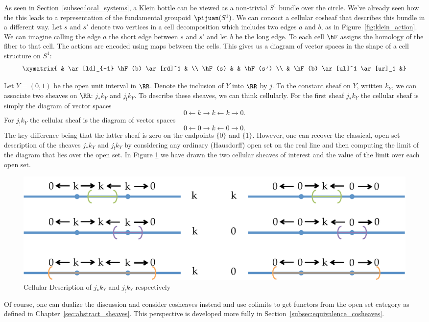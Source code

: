 \begin{ex}
 As seen in Section~\ref{subsec:local_systems}, a Klein bottle can be viewed as a non-trivial $S^1$ bundle over the circle. We've already seen how the this leads to a representation of the fundamental groupoid $\pijuan(S^1)$. We can concoct a cellular cosheaf that describes this bundle in a different way. Let $s$ and $s'$ denote two vertices in a cell decomposition which includes two edges $a$ and $b$, as in Figure~\ref{fig:klein_action}. We can imagine calling the edge $a$ the short edge between $s$ and $s'$ and let $b$ be the long edge. To each cell $\hF$ assigns the homology of the fiber to that cell. The actions are encoded using maps between the cells. This gives us a diagram of vector spaces in the shape of a cell structure on $S^1$:
 \[
  \xymatrix{ & \ar[ld]_{-1} \hF(b) \ar[rd]^1 & \\
  \hF(s) & & \hF(s') \\
  & \hF(b) \ar[ul]^1 \ar[ur]_1 &}
 \]
\end{ex}

\begin{ex}
Let $Y=(0,1)$ be the open unit interval in $\RR$. Denote the inclusion of $Y$ into $\RR$ by $j$. To the constant sheaf on $Y$, written $k_Y$, we can associate two sheaves on $\RR$: $j_*k_Y$ and $j_! k_Y$. To describe these sheaves, we can think cellularly. For the first sheaf $j_*k_Y$ the cellular sheaf is simply the diagram of vector spaces
\[
0 \leftarrow k \rightarrow k \leftarrow k \rightarrow 0.
\]
For $j_!k_Y$ the cellular sheaf is the diagram of vector spaces
\[
0 \leftarrow 0 \rightarrow k \leftarrow 0 \rightarrow 0.
\]
The key difference being that the latter sheaf is zero on the endpoints $\{0\}$ and $\{1\}$. However, one can recover the classical, open set description of the sheaves $j_*k_Y$ and $j_! k_Y$ by considering any ordinary (Hausdorff) open set on the real line and then computing the limit of the diagram that lies over the open set. In Figure \ref{fig:star_shriek} we have drawn the two cellular sheaves of interest and the value of the limit over each open set.
	\begin{figure}
	\centering
	\includegraphics[width=\textwidth]{star_shriek.pdf}
	\caption{Cellular Description of $j_*k_Y$ and $j_!k_Y$ respectively}
	\label{fig:star_shriek}
	\end{figure}
Of course, one can dualize the discussion and consider cosheaves instead and use colimits to get functors from the open set category as defined in Chapter~\ref{sec:abstract_sheaves}. This perspective is developed more fully in Section~\ref{subsec:equivalence_cosheaves}.
\end{ex}

